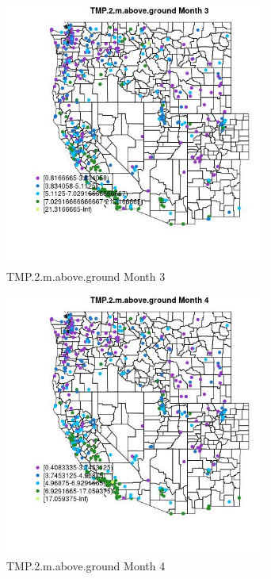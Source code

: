 \begin{figure} 
\centering  
\includegraphics[width=0.77\textwidth]{Code_Outputs/ML_input_report_ML_input_PM25_Step5_part_d_de_duplicated_aves_ML_input_MapObsMo3TMP2maboveground.jpg} 
\caption{\label{fig:ML_input_report_ML_input_PM25_Step5_part_d_de_duplicated_aves_ML_inputMapObsMo3TMP2maboveground}TMP.2.m.above.ground Month 3} 
\end{figure} 
 

\begin{figure} 
\centering  
\includegraphics[width=0.77\textwidth]{Code_Outputs/ML_input_report_ML_input_PM25_Step5_part_d_de_duplicated_aves_ML_input_MapObsMo4TMP2maboveground.jpg} 
\caption{\label{fig:ML_input_report_ML_input_PM25_Step5_part_d_de_duplicated_aves_ML_inputMapObsMo4TMP2maboveground}TMP.2.m.above.ground Month 4} 
\end{figure} 
 

